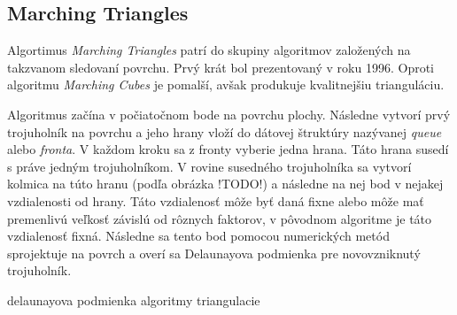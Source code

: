 \subsection{Marching Triangles}

Algortimus \textit{Marching Triangles} \cite{hilton1996marching} patrí do skupiny algoritmov založených na takzvanom 
sledovaní povrchu. Prvý krát bol prezentovaný v roku 1996. Oproti algoritmu \textit{Marching Cubes} je pomalší, avšak
produkuje kvalitnejšiu trianguláciu. 

Algoritmus začína v počiatočnom bode na povrchu plochy. Následne vytvorí prvý trojuholník na povrchu a jeho hrany vloží do dátovej
štruktúry nazývanej \textit{queue} alebo \textit{fronta}. V každom kroku sa z fronty vyberie jedna hrana. Táto hrana susedí s 
práve jedným trojuholníkom. V rovine susedného trojuholníka sa vytvorí kolmica na túto hranu (podľa obrázka !TODO!) a 
následne na nej bod v nejakej vzdialenosti od hrany. 
Táto vzdialenosť môže byť daná fixne alebo môže mať premenlivú veľkosť závislú od rôznych faktorov, v pôvodnom algoritme je 
táto vzdialenosť fixná. 
Následne sa tento bod pomocou numerických metód sprojektuje na povrch a overí sa Delaunayova podmienka pre novovzniknutý 
trojuholník. 



delaunayova podmienka
algoritmy triangulacie






